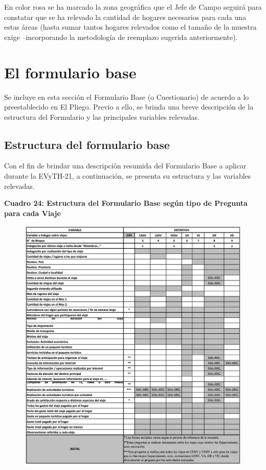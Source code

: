 \documentclass[
  openany]{book}
\begin{document}
En color rosa se ha marcado la zona geográfica que el Jefe de Campo seguirá para constatar que se ha relevado la cantidad de hogares necesarios para cada una estas áreas (hasta sumar tantos hogares relevados como el tamaño de la muestra exige --incorporando la metodología de reemplazo sugerida anteriormente).

\hypertarget{el-formulario-base}{%
\section{El formulario base}\label{el-formulario-base}}

Se incluye en esta sección el Formulario Base (o Cuestionario) de acuerdo a lo preestablecido en El Pliego. Previo a ello, se brinda una breve descripción de la estructura del Formulario y las principales variables relevadas.

\hypertarget{estructura-del-formulario-base}{%
\subsection{Estructura del formulario base}\label{estructura-del-formulario-base}}

Con el fin de brindar una descripción resumida del Formulario Base a aplicar durante la EVyTH-21, a continuación, se presenta su estructura y las variables relevadas.

\textbf{Cuadro 24: Estructura del Formulario Base según tipo de Pregunta para cada Viaje}

\begin{figure}

{\centering \includegraphics[width=1\linewidth]{imagenes/figura6-151} 

}

\end{figure}
\end{document}
